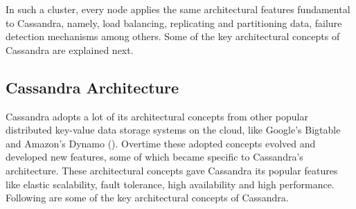 In such a cluster,  every node applies the same architectural features
fundamental to Cassandra,  namely,  load balancing,  replicating
and partitioning data,  failure detection mechanisms among others.  Some of the
key architectural concepts of Cassandra are explained next. 




\subsection{Cassandra Architecture} \label{ss:Background-Cassandra-Archi}
Cassandra adopts a lot of its architectural concepts from other popular
distributed key-value data storage systems on the cloud,  like Google's Bigtable
and Amazon's Dynamo ().  Overtime these adopted concepts evolved and
developed new features,  some of which became specific to Cassandra's
architecture.  These architectural concepts gave
Cassandra its popular features like elastic scalability,  fault tolerance,  high
availability and high performance. 
Following are some of the key architectural concepts of Cassandra. 

